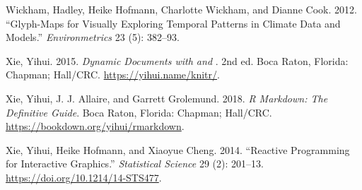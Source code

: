 \documentclass{article}
\newlength{\cslhangindent}
\newlength{\cslentryspacingunit} %
\newenvironment{CSLReferences}[2] %
 {%
  \setlength{\parindent}{0pt}
  \ifodd #1
  \let\oldpar\par
  \def\par{\hangindent=\cslhangindent\oldpar}
  \fi
  \setlength{\parskip}{#2\cslentryspacingunit}
 }%
 {}
\begin{document}
\begin{CSLReferences}{1}{0}
\leavevmode{}%
Wickham, Hadley, Heike Hofmann, Charlotte Wickham, and Dianne Cook. 2012. {``Glyph-Maps for Visually Exploring Temporal Patterns in Climate Data and Models.''} \emph{Environmetrics} 23 (5): 382--93.

\leavevmode{}%
Xie, Yihui. 2015. \emph{Dynamic Documents with  and }. 2nd ed. Boca Raton, Florida: Chapman; Hall/CRC. \url{https://yihui.name/knitr/}.

\leavevmode{}%
Xie, Yihui, J. J. Allaire, and Garrett Grolemund. 2018. \emph{R Markdown: The Definitive Guide}. Boca Raton, Florida: Chapman; Hall/CRC. \url{https://bookdown.org/yihui/rmarkdown}.

\leavevmode{}%
Xie, Yihui, Heike Hofmann, and Xiaoyue Cheng. 2014. {``{Reactive Programming for Interactive Graphics}.''} \emph{Statistical Science} 29 (2): 201--13. \url{https://doi.org/10.1214/14-STS477}.

\end{CSLReferences}



\end{document}
